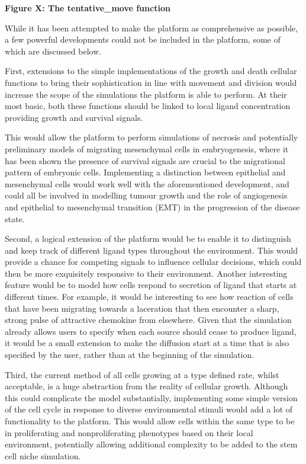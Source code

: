 \documentclass[12pt,a4paper]{report}
\begin{document}
{\bfseries Figure X: The tentative\_move function}



While it has been attempted to make the platform as comprehensive as 
possible, a few powerful developments could not be included in the 
platform, some of which are discussed below. 



First, extensions to the simple implementations of the growth and death 
cellular functions to bring their sophistication in line with movement 
and division would increase the scope of the simulations the platform is 
able to perform. At their most basic, both these functions should be 
linked to local ligand concentration providing growth and survival 
signals. 



This would allow the platform to perform simulations of necrosis and 
potentially preliminary models of migrating mesenchymal cells in 
embryogenesis, where it has been shown the presence of survival signals 
are crucial to the migrational pattern of embryonic cells. Implementing 
a distinction between epithelial and mesenchymal cells would work well 
with the aforementioned development, and could all be involved in 
modelling tumour growth and the role of angiogenesis and epithelial to 
mesenchymal transition (EMT) in the progression of the disease state.



Second, a logical extension of the platform would be to enable it to 
distinguish and keep track of different ligand types throughout the 
environment. This would provide a chance for competing signals to 
influence cellular decisions, which could then be more exquisitely 
responsive to their environment. Another interesting feature would be to 
model how cells respond to secretion of ligand that starts at different 
times. For example, it would be interesting to see how reaction of cells 
that have been migrating towards a laceration that then encounter a 
sharp, strong pulse of attractive chemokine from elsewhere. Given that 
the simulation already allows users to specify when each source should 
cease to produce ligand, it would be a small extension to make the 
diffusion start at a time that is also specified by the user, rather 
than at the beginning of the simulation. 



Third, the current method of all cells growing at a type defined rate, 
whilst acceptable, is a huge abstraction from the reality of cellular 
growth. Although this could complicate the model substantially, 
implementing some simple version of the cell cycle in response to 
diverse environmental stimuli would add a lot of functionality to the 
platform. This would allow cells within the same type to be in 
proliferating and nonproliferating phenotypes based on their local 
environment, potentially allowing additional complexity to be added to 
the stem cell niche simulation.
\end{document}
